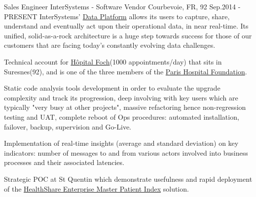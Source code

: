 

\begin{cventries}

  \cventry
    {Sales Engineer} %
    {InterSystems - Software Vendor} %
    {Courbevoie, FR, 92} %
    {Sep.2014 - PRESENT} %
{
InterSystems' \href{https://www.intersystems.com/products/intersystems-iris/}{Data Platform} allows its users to capture, share, understand and eventually act upon their operational data, in near real-time. Its unified, solid-as-a-rock architecture is a huge step towards success for those of our customers that are facing today's constantly evolving data challenges.
} %
{
      \begin{cvitems} %
        \item {Technical account for \href{http://www.hopital-foch.com/hopital/}{Hôpital Foch}(1000 appointments/day) that sits in Suresnes(92), and is one of the three members of the \href{http://www.phf.paris/?lang=en}{Paris Hospital Foundation}.}
        \item {Static code analysis tools development in order to evaluate the upgrade complexity and track its progression, deep involving with key users which are typically "very busy at other projects", massive refactoring hence non-regression testing and UAT, complete reboot of Ops procedures: automated installation, failover, backup, supervision and Go-Live.}
        \item {Implementation of real-time insights (average and standard deviation) on key indicators: number of messages to and from various actors involved into business processes and their associated latencies.}
        \item {Strategic POC at St Quentin which demonstrate usefulness and rapid deployment of the \href{https://www.intersystems.com/products/healthshare/patient-index/}{HealthShare Enterprise Master Patient Index} solution.}

\end{cvitems}}
\end{cventries}

